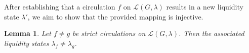 \documentclass[10pt,twocolumn]{article}
\newtheorem{lemma}[theorem]{Lemma}
\begin{document}


After establishing that a circulation \(f\) on \(\mathcal{L}(G,\lambda)\) results in a new liquidity state \(\lambda'\), we aim to show that the provided mapping is injective.

\begin{lemma}
  Let \(f \neq g\) be strict circulations on \(\mathcal{L}(G,\lambda)\). Then the associated liquidity states \(\lambda_f \neq \lambda_g\).
\end{lemma}
\end{document}

